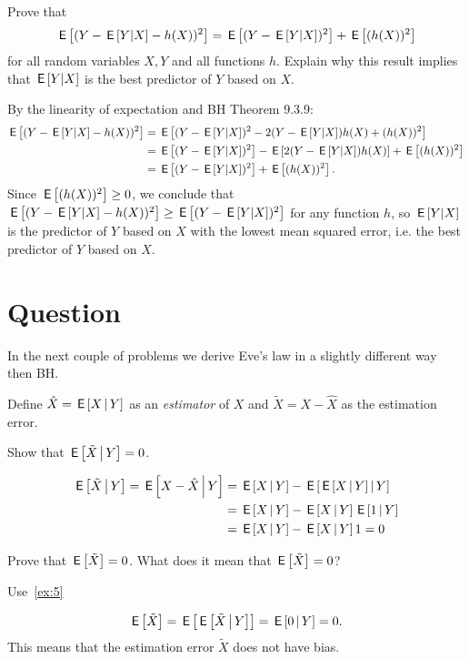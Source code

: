 \begin{exercise}
Prove that
\begin{equation}
  \label{eq:21}
\E{(Y - \E{Y|X} - h(X))^2} = \E{(Y - \E{Y|X})^2} + \E{(h(X))^2}
\end{equation}
for all random variables $X, Y$ and all functions $h$. Explain why this result implies that  $\,\mathsf{E}\left[Y|X\right]$ is the best predictor of $Y$ based on $X$.
\begin{solution}
By the linearity of expectation and BH Theorem 9.3.9:
\begin{align*}
\,\mathsf{E}\left[(Y - \,\mathsf{E}\left[Y|X\right] - h(X))^2\right] &= \,\mathsf{E}\left[(Y - \,\mathsf{E}\left[Y|X\right])^2 - 2(Y - \,\mathsf{E}\left[Y|X\right])h(X) + (h(X))^2\right]
\\ &= \,\mathsf{E}\left[(Y - \,\mathsf{E}\left[Y|X\right])^2\right] - \,\mathsf{E}\left[2(Y - \,\mathsf{E}\left[Y|X\right])h(X)\right] + \,\mathsf{E}\left[(h(X))^2\right]
\\ &= \,\mathsf{E}\left[(Y - \,\mathsf{E}\left[Y|X\right])^2\right] + \,\mathsf{E}\left[(h(X))^2\right].
\end{align*}
Since $\,\mathsf{E}\left[(h(X))^2\right] \geq 0$, we conclude that $\,\mathsf{E}\left[(Y - \,\mathsf{E}\left[Y|X\right] - h(X))^2\right] \geq \,\mathsf{E}\left[(Y - \,\mathsf{E}\left[Y|X\right])^2\right]$ for any function $h$, so $\,\mathsf{E}\left[Y|X\right]$ is the predictor of $Y$ based on $X$ with the lowest mean squared error, i.e. the best predictor of $Y$ based on $X$.
\end{solution}
\end{exercise}


\section*{Question}
In the next couple of problems we derive Eve's law in a slightly different way then BH.

Define $\hat X = \,\mathsf{E}\left[X\,\middle|\, Y\right]$ as an \emph{estimator} of $X$ and $\tilde X = X - \hat X$ as the estimation error.

\begin{exercise}\label{ex:5}
Show that $\,\mathsf{E}\left[\tilde X\,\middle|\, Y\right] = 0$.
\begin{solution}
\begin{align}
\label{eq:4}
\E{\tilde X \given Y} = \E{X - \hat X \given Y} &=
\E{X\given Y}  - \E{ \E{X\given Y}\given Y}  \\
&=\E{X\given Y}  -  \E{X\given Y}\E{1\given Y}  \\
&=\E{X\given Y}  -  \E{X\given Y}1 = 0
\end{align}
\end{solution}
\end{exercise}

\begin{exercise}\label{ex:4}
Prove that $\,\mathsf{E}\left[\tilde X\right] = 0$. What does it mean that $\,\mathsf{E}\left[\tilde X\right] =0$?
\begin{hint}
  Use~\cref{ex:5}
\end{hint}
\begin{solution}
\begin{equation}
\label{eq:5}
\E{\tilde X} = \E{\E{\tilde X\given Y}} = \E{ 0 \given Y} =0.
\end{equation}
This means that the estimation error $\tilde X$ does not have bias.
\end{solution}
\end{exercise}


